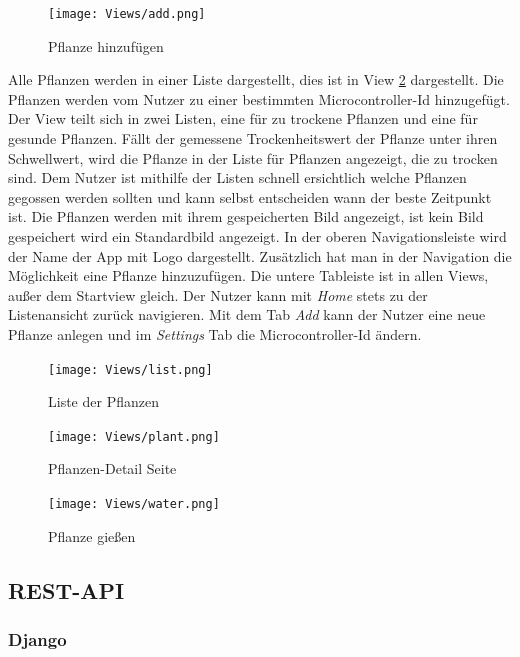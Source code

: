 \begin{figure}[H]
    \centering
    \texttt{[image: Views/add.png]}
    \caption{Pflanze hinzufügen}
    \label{add}
\end{figure}


Alle Pflanzen werden in einer Liste dargestellt, dies ist in View \ref{list} dargestellt. Die Pflanzen werden vom Nutzer zu einer bestimmten Microcontroller-Id hinzugefügt. Der View teilt sich in zwei Listen, eine für zu trockene Pflanzen und eine für gesunde Pflanzen. Fällt der gemessene Trockenheitswert der Pflanze unter ihren Schwellwert, wird die Pflanze in der Liste für Pflanzen angezeigt, die zu trocken sind. Dem Nutzer ist mithilfe der Listen schnell ersichtlich welche Pflanzen gegossen werden sollten und kann selbst entscheiden wann der beste Zeitpunkt ist. Die Pflanzen werden mit ihrem gespeicherten Bild angezeigt, ist kein Bild gespeichert wird ein Standardbild angezeigt. In der oberen Navigationsleiste wird der Name der App mit Logo dargestellt. Zusätzlich hat man in der Navigation die Möglichkeit eine Pflanze hinzuzufügen. Die untere Tableiste ist in allen Views, außer dem Startview gleich. Der Nutzer kann mit \textit{Home} stets zu der Listenansicht zurück navigieren. Mit dem Tab \textit{Add} kann der Nutzer eine neue Pflanze anlegen und im \textit{Settings} Tab die Microcontroller-Id ändern.
\begin{figure}[H]
    \centering
    \texttt{[image: Views/list.png]}
    \caption{Liste der Pflanzen}
    \label{list}
\end{figure}

\begin{figure}[H]
    \centering
    \texttt{[image: Views/plant.png]}
    \caption{Pflanzen-Detail Seite}
    \label{plant}
\end{figure}

\begin{figure}[H]
    \centering
    \texttt{[image: Views/water.png]}
    \caption{Pflanze gießen}
    \label{water}
\end{figure}

    \subsection{REST-API}

        \subsubsection{Django}
